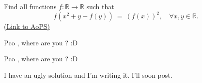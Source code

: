 \begin{problem}
	Find all functions $ f : \mathbb{R} \to \mathbb{R}$ such that
\[f( x^2 + y + f(y)) \ = \ (f(x))^2, \quad \forall x , y  \in \mathbb{R}.\]
	\flushright \href{https://artofproblemsolving.com/community/c6h306007}{(Link to AoPS)}
\end{problem}



\begin{solution}
	Pco , where are you ? :D
\end{solution}



\begin{solution}
	\begin{tcolorbox}Pco , where are you ? :D\end{tcolorbox}
I have an ugly solution and I'm writing it. I'll soon post.
\end{solution}



